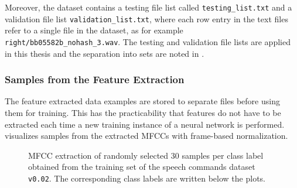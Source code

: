 Moreover, the dataset contains a testing file list called \texttt{testing\_list.txt} and a validation file list \texttt{validation\_list.txt}, where each row entry in the text files refer to a single file in the dataset, as for example \texttt{right/bb05582b\_nohash\_3.wav}.
The testing and validation file lists are applied in this thesis and the separation into sets are noted in .



\subsubsection{Samples from the Feature Extraction}
The feature extracted data examples are stored to separate files before using them for training.
This has the practicability that features do not have to be extracted each time a new training instance of a neural network is performed.
 visualizes samples from the extracted MFCCs with frame-based normalization.
\begin{figure}[!ht]
  \centering
  \caption{MFCC extraction of randomly selected 30 samples per class label obtained from the training set of the speech commands dataset \texttt{v0.02}. The corresponding class labels are written below the plots.}
  \label{fig:exp_dataset_speech_cmd_mfcc}
\end{figure}
\FloatBarrier
\noindent


